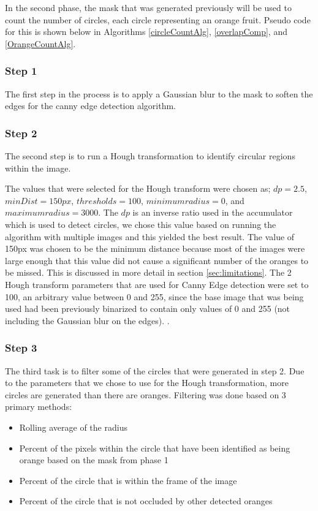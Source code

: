 \documentclass[conference]{IEEEtran}
\begin{document}
In the second phase, the mask that was generated previously will be used to count the number of circles, each circle representing an orange fruit. Pseudo code for this is shown below in Algorithms \ref{circleCountAlg}, \ref{overlapComp}, and \ref{OrangeCountAlg}. 

\subsubsection{Step 1}
The first step in the process is to apply a Gaussian blur to the mask to soften the edges for the canny edge detection algorithm. 


\subsubsection{Step 2} 
The second step is to run a Hough transformation to identify circular regions within the image.

The values that were selected for the Hough transform were chosen as; $dp = 2.5$, $minDist = 150px$, $thresholds = 100$, $minimum radius = 0$, and  $maximum radius = 3000$. The $dp$ is an inverse ratio used in the accumulator which is used to detect circles, we chose this value based on running the algorithm with multiple images and this yielded the best result. The value of 150px was chosen to be the minimum distance because most of the images were large enough that this value did not cause a significant number of the oranges to be missed. This is discussed in more detail in section \ref{sec:limitations}. The 2 Hough transform parameters that are used for Canny Edge detection were set to 100, an arbitrary value between 0 and 255, since the base image that was being used had been previously binarized to contain only values of 0 and 255 (not including the Gaussian blur on the edges). \cite{yadav_approach_2014}.


\subsubsection{Step 3}
The third task is to filter some of the circles that were generated in step 2. Due to the parameters that we chose to use for the Hough transformation, more circles are generated than there are oranges. Filtering was done based on 3 primary methods:

\begin{itemize}
\item Rolling average of the radius
\item Percent of the pixels within the circle that have been identified as being orange based on the mask from phase 1
\item Percent of the circle that is within the frame of the image
\item Percent of the circle that is not occluded by other detected oranges
\end{itemize}
\end{document}
